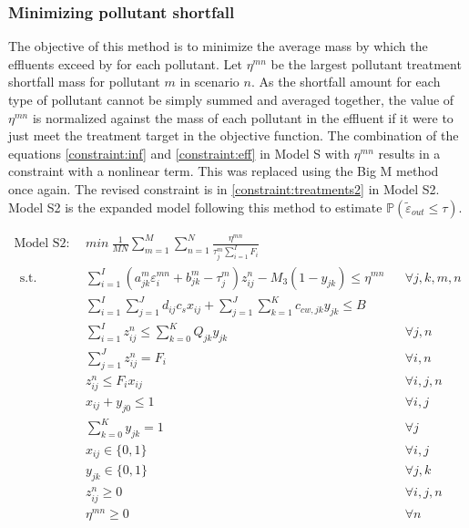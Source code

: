 \documentclass[preprint,12pt,authoryear]{elsarticle}
\newcommand{\bP}{\mathbb P}
\begin{document}
\subsubsection{Minimizing pollutant shortfall}\label{subsect:minshortfall}
The objective of this method is to minimize the average mass by which the effluents exceed by for each pollutant. Let $\eta^{mn}$ be the largest pollutant treatment shortfall mass for pollutant $m$ in scenario $n$. As the shortfall amount for each type of pollutant cannot be simply summed and averaged together, the value of $\eta^{mn}$ is normalized against the mass of each pollutant in the effluent if it were to just meet the treatment target in the objective function. The combination of the equations \ref{constraint:inf} and \ref{constraint:eff} in Model S with $\eta^{mn}$ results in a constraint with a nonlinear term. This was replaced using the Big M method once again. The revised constraint is in \autoref{constraint:treatments2} in Model S2. Model S2 is the expanded model following this method to estimate $\bP (\tilde{\varepsilon}_{out} \leq \tau)$.

\setcounter{equation}{0}
\begin{align}%
	\text{Model S2}:~~&min ~ \frac{1}{MN}\sum_{m=1}^M\sum_{n=1}^N \frac{\eta^{mn}}{\tau_j^m \sum_{i=1}^I F_i} \nonumber\\~~
	\mbox{s.t.}~~
	&\sum_{i=1}^I (a_{jk}^m \varepsilon_i^{mn} + b_{jk}^m - \tau_j^m) z_{ij}^n - M_3 (1 - y_{jk})\leq \eta^{mn} && \forall j,k,m,n \label{constraint:treatments2}\\	
	&\sum_{i=1}^{I}\sum_{j=1}^{J}d_{ij}c_s x_{ij} + \sum_{j=1}^{J}\sum_{k=1}^{K}c_{cw,jk}y_{jk} \leq B && \\
 	&\sum_{i=1}^{I} z_{ij}^n \leq \sum_{k=0}^K Q_{jk} y_{jk} && \forall j,n\\
	&\sum_{j=1}^J z_{ij}^n = F_i && \forall i,n\\
	&z_{ij}^n \leq F_i x_{ij} && \forall i,j,n\\
	&x_{ij} + y_{j0} \leq 1 && \forall i,j\\
	&\sum_{k=0}^{K}y_{jk} = 1&&\forall j\\
	&x_{ij} \in \{0,1\}&&\forall i,j\\
	&y_{jk} \in \{0,1\}&&\forall j,k\\
	&z_{ij}^n \geq 0&&\forall i,j,n\\ 
	&\eta^{mn} \geq 0&&\forall n
\end{align}
\renewcommand{\theequation}{\thesection--\arabic{equation}}
\end{document}
